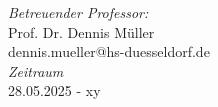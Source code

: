 \begin{titlepage}
\begin{center}
        \textit{Betreuender Professor:} \\
        Prof. Dr. Dennis Müller\\
        dennis.mueller@hs-duesseldorf.de \\[1cm]

        \textit{Zeitraum} \\
        28.05.2025 - xy
    \end{center}

    \vspace{3cm} %


\end{titlepage}

